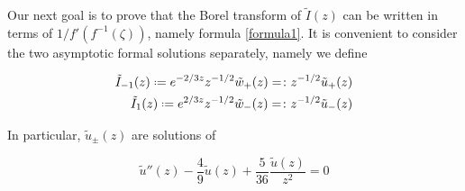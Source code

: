 \documentclass[11pt,a4paper,twoside,leqno,noamsfonts]{amsart}
\numberwithin{equation}{section}
\begin{document}
\begin{example}[Airy]

Our next goal is to prove that the Borel transform of $\tilde{I}(z)$ can be written in terms of $1/f'(f^{-1}(\zeta))$, namely formula \eqref{formula1}. It is convenient to consider the two asymptotic formal solutions separately, namely we define

\begin{align}
\tilde{I}_{-1}(z)\defeq e^{-2/3z}z^{-1/2}\tilde{w}_+(z)=\colon z^{-1/2}\tilde{u}_+(z) \\
\tilde{I}_{1}(z)\defeq e^{2/3z}z^{-1/2}\tilde{w}_-(z)=\colon z^{-1/2}\tilde{u}_-(z)
\end{align}
 
In particular, $\tilde{u}_{\pm}(z)$ are solutions of 

\begin{equation}\label{eq:u}
\tilde{u}''(z)-\frac{4}{9}\tilde{u}(z)+\frac{5}{36}\frac{\tilde{u}(z)}{z^2}=0
\end{equation} 


\end{example}
\end{document}
